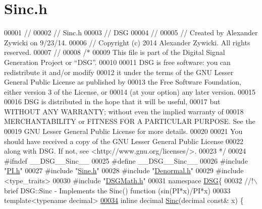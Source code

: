 \hypertarget{_sinc_8h_source}{\section{Sinc.\+h}
\label{_sinc_8h_source}
}

\begin{DoxyCode}
00001 \textcolor{comment}{//}
00002 \textcolor{comment}{//  Sinc.h}
00003 \textcolor{comment}{//  DSG}
00004 \textcolor{comment}{//}
00005 \textcolor{comment}{//  Created by Alexander Zywicki on 9/23/14.}
00006 \textcolor{comment}{//  Copyright (c) 2014 Alexander Zywicki. All rights reserved.}
00007 \textcolor{comment}{//}
00008 \textcolor{comment}{/*}
00009 \textcolor{comment}{ This file is part of the Digital Signal Generation Project or “DSG”.}
00010 \textcolor{comment}{}
00011 \textcolor{comment}{ DSG is free software: you can redistribute it and/or modify}
00012 \textcolor{comment}{ it under the terms of the GNU Lesser General Public License as published by}
00013 \textcolor{comment}{ the Free Software Foundation, either version 3 of the License, or}
00014 \textcolor{comment}{ (at your option) any later version.}
00015 \textcolor{comment}{}
00016 \textcolor{comment}{ DSG is distributed in the hope that it will be useful,}
00017 \textcolor{comment}{ but WITHOUT ANY WARRANTY; without even the implied warranty of}
00018 \textcolor{comment}{ MERCHANTABILITY or FITNESS FOR A PARTICULAR PURPOSE.  See the}
00019 \textcolor{comment}{ GNU Lesser General Public License for more details.}
00020 \textcolor{comment}{}
00021 \textcolor{comment}{ You should have received a copy of the GNU Lesser General Public License}
00022 \textcolor{comment}{ along with DSG.  If not, see <http://www.gnu.org/licenses/>.}
00023 \textcolor{comment}{ */}
00024 \textcolor{preprocessor}{#ifndef \_\_DSG\_\_Sinc\_\_}
00025 \textcolor{preprocessor}{#define \_\_DSG\_\_Sinc\_\_}
00026 \textcolor{preprocessor}{#include "\hyperlink{_p_i_8h}{PI.h}"}
00027 \textcolor{preprocessor}{#include "\hyperlink{_sine_8h}{Sine.h}"}
00028 \textcolor{preprocessor}{#include "\hyperlink{_denormal_8h}{Denormal.h}"}
00029 \textcolor{preprocessor}{#include <type\_traits>}
00030 \textcolor{preprocessor}{#include "\hyperlink{_d_s_g_math_8h}{DSGMath.h}"}
00031 \textcolor{keyword}{namespace }\hyperlink{namespace_d_s_g}{DSG}\{\textcolor{comment}{}
00032 \textcolor{comment}{    //!\(\backslash\)brief DSG::Sinc - Implements the Sinc() function (sin(PI*x)/PI*x)}
00033 \textcolor{comment}{}    \textcolor{keyword}{template}<\textcolor{keyword}{typename} decimal>
\hypertarget{_sinc_8h_source_l00034}{}\hyperlink{namespace_d_s_g_a6a99a1c242cddf18f4387f51ec8606b4}{00034}     \textcolor{keyword}{inline} decimal \hyperlink{namespace_d_s_g_a6a99a1c242cddf18f4387f51ec8606b4}{Sinc}(decimal \textcolor{keyword}{const}& x) \{

\end{DoxyCode}
